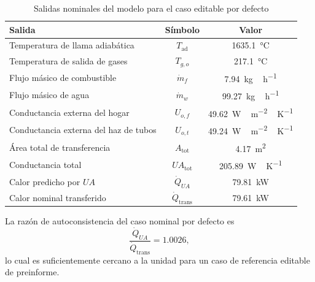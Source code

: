 \documentclass[conference]{IEEEtran}
\begin{document}
\begin{table}[!t]
\caption{Salidas nominales del modelo para el caso editable por defecto}
\label{tab:results}
\centering
\begin{tabular}{@{}lcc@{}}
\toprule
Salida & S\'imbolo & Valor \\
\midrule
Temperatura de llama adiab\'atica & $T_{\mathrm{ad}}$ & \SI{1635.1}{\degreeCelsius} \\
Temperatura de salida de gases & $T_{g,o}$ & \SI{217.1}{\degreeCelsius} \\
Flujo m\'asico de combustible & $\dot{m}_f$ & \SI{7.94}{kg\,h^{-1}} \\
Flujo m\'asico de agua & $\dot{m}_w$ & \SI{99.27}{kg\,h^{-1}} \\
Conductancia externa del hogar & $U_{o,f}$ & \SI{49.62}{W\,m^{-2}\,K^{-1}} \\
Conductancia externa del haz de tubos & $U_{o,t}$ & \SI{49.24}{W\,m^{-2}\,K^{-1}} \\
\'Area total de transferencia & $A_{\mathrm{tot}}$ & \SI{4.17}{m^2} \\
Conductancia total & $UA_{\mathrm{tot}}$ & \SI{205.89}{W\,K^{-1}} \\
Calor predicho por $UA$ & $\dot{Q}_{UA}$ & \SI{79.81}{kW} \\
Calor nominal transferido & $\dot{Q}_{\mathrm{trans}}$ & \SI{79.61}{kW} \\
\bottomrule
\end{tabular}
\end{table}

La raz\'on de autoconsistencia del caso nominal por defecto es
\begin{equation}
\frac{\dot{Q}_{UA}}{\dot{Q}_{\mathrm{trans}}}=1.0026,
\label{eq:consistency}
\end{equation}
lo cual es suficientemente cercano a la unidad para un caso de referencia editable de preinforme.
\end{document}
